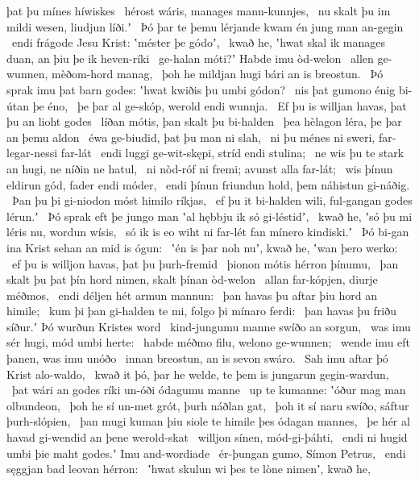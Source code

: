 þat þu mínes híwiskes \hld\ hérost wáris,
manages mann-kunnjes, \hld\ nu skalt þu im mildi wesen,
liudjun líði.ʼ \hld\ Þó þar te þemu lérjande kwam
én jung man an-gegin \hld\ endi frágode Jesu Krist:
ʽméster þe gódoʼ, \hld\ kwað he, ʽhwat skal ik manages duan,
an þiu þe ik heven-ríki \hld\ ge-halan móti?ʼ
Habde imu òd-welon \hld\ allen ge-wunnen,
mèðom-hord manag, \hld\ þoh he mildjan hugi
bári an is breostun. \hld\ Þó sprak imu þat barn godes:
ʽhwat kwiðis þu umbi gódon? \hld\ nis þat gumono énig
bi-útan þe éno, \hld\ þe þar al ge-skóp,
werold endi wunnja. \hld\ Ef þu is willjan havas,
þat þu an lioht godes \hld\ líðan mótis,
þan skalt þu bi-halden \hld\ þea hèlagon léra,
þe þar an þemu aldon \hld\ éwa ge-biudid,
þat þu man ni slah, \hld\ ni þu ménes ni sweri,
far-legar-nessi far-lát \hld\ endi luggi ge-wit-skępi,
stríd endi stulina; \hld\ ne wis þu te stark an hugi,
ne níðin ne hatul, \hld\ ni nòd-róf ni fremi;
avunst alla far-lát; \hld\ wis þínun eldirun gód,
fader endi móder, \hld\ endi þínun friundun hold,
þem náhistun gi-náðig. \hld\ Þan þu þi gi-niodon móst
himilo ríkjas, \hld\ ef þu it bi-halden wili,
ful-gangan godes lérun.ʼ \hld\ Þó sprak eft þe jungo man
ʽal hębbju ik só gi-léstidʼ, \hld\ kwað he, ʽsó þu mi léris nu,
wordun wísis, \hld\ só ik is eo wiht ni far-lét
fan mínero kindiski.ʼ \hld\ Þó bi-gan ina Krist sehan
an mid is ógun: \hld\ ʽén is þar noh nuʼ, kwað he,
ʽwan þero werko: \hld\ ef þu is willjon havas,
þat þu þurh-fremid \hld\ þionon mótis
hérron þínumu, \hld\ þan skalt þu þat þín hord nimen,
skalt þínan òd-welon \hld\ allan far-kópjen,
diurje méðmos, \hld\ endi déljen hét
armun mannun: \hld\ þan havas þu aftar þiu
hord an himile; \hld\ kum þi þan gi-halden te mi,
folgo þi mínaro ferdi: \hld\ þan havas þu friðu síður.ʼ
Þó wurðun Kristes word \hld\ kind-jungumu manne
swíðo an sorgun, \hld\ was imu sér hugi,
mód umbi herte: \hld\ habde méðmo filu,
welono ge-wunnen; \hld\ wende imu eft þanen,
was imu unóðo \hld\ innan breostun,
an is sevon swáro. \hld\ Sah imu aftar þó
Krist alo-waldo, \hld\ kwað it þó, þar he welde,
te þem is jungarun gegin-wardun, \hld\ þat wári an godes ríki
un-óði ódagumu manne \hld\ up te kumanne:
ʽóður mag man olbundeon, \hld\ þoh he sí un-met grót,
þurh náðlan gat, \hld\ þoh it sí naru swíðo,
sáftur þurh-slópien, \hld\ þan mugi kuman þiu siole te himile
þes ódagan mannes, \hld\ þe hér al havad
gi-wendid an þene werold-skat \hld\ willjon sínen,
mód-gi-þáhti, \hld\ endi ni hugid umbi þie maht godes.ʼ
Imu and-wordiade \hld\ ér-þungan gumo,
Símon Petrus, \hld\ endi sęggjan bad
leovan hérron: \hld\ ʽhwat skulun wi þes te lòne nimenʼ, kwað he,
